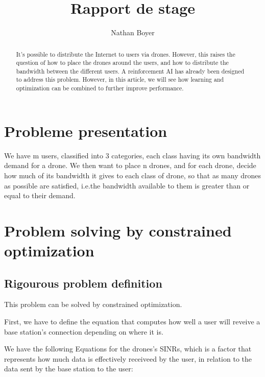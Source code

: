\documentclass[letterpaper]{article}
\title{Rapport de stage}
\author{Nathan Boyer}
\begin{document}
\maketitle


\begin{multicols}{2}
    


\begin{abstract}
    
    It's possible to distribute the Internet to users via drones.
    However, this raises the question of how to place the drones around the users, and how to distribute the bandwidth between the different users.
    A reinforcement AI has already been designed to address this problem.
    However, in this article, we will see how learning and optimization can be combined to further improve performance.

\end{abstract}


\section{Probleme presentation}

We have m users, classified into 3 categories, each class having its own bandwidth demand for a drone.
We then want to place n drones, and for each drone, decide how much of its bandwidth it gives to each class of drone, so that as many drones as possible are satisfied, i.e.\:the bandwidth available to them is greater than or equal to their demand.

\section{Problem solving by constrained optimization}

\subsection{Rigourous problem definition}

This problem can be solved by constrained optimization.

First, we have to define the equation that computes how well a user will reveive a base station's connection depending on where it is.

We have the following Equations for the drones's SINRs, which is a factor that represents how much data is effectively receiveed by the user, in relation to the data sent by the base station to the user:


\end{multicols}
\end{document}
